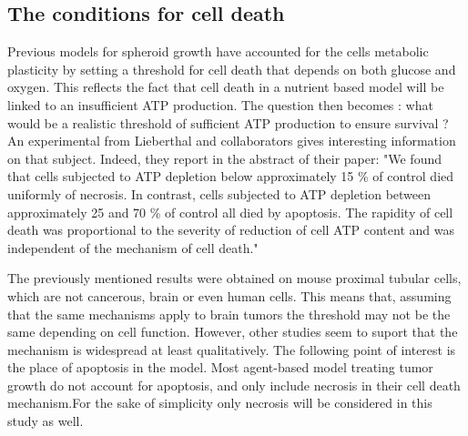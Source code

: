 \documentclass[11pt,a4paper]{article}
\begin{document}
\subsection{The conditions for cell death}
Previous models for spheroid growth have accounted for the cells metabolic plasticity by setting a threshold for cell death that depends on both glucose and oxygen.\cite{Kempf2005}\cite{Jagiella2016} This reflects the fact that cell death in a nutrient based model will be linked to an insufficient ATP production. The question then becomes : what would be a realistic threshold of sufficient ATP production to ensure survival ? An experimental from Lieberthal and collaborators gives interesting information on that subject. Indeed, they report in the abstract of their paper: "We found that cells subjected to ATP depletion below approximately 15 \% of control died uniformly of necrosis. In contrast, cells subjected to ATP depletion between approximately 25 and 70 \% of control all died by apoptosis. The rapidity of cell death was proportional to the severity of reduction of cell ATP content and was independent of the mechanism of cell death."\cite{Lieberthal1998}

The previously mentioned  results were obtained on mouse proximal tubular cells, which are not cancerous, brain or even human cells. This means that, assuming that the same mechanisms apply to brain tumors  the threshold may not be the same depending on cell function. However, other studies seem to suport that the mechanism is widespread at least qualitatively.\cite{Martin2001} The following point of interest is the place of apoptosis in the model. Most agent-based model treating tumor growth do not account for apoptosis, and only include necrosis in their cell death mechanism.\cite{Mao2018}\cite{Kempf2005}\cite{Kempf2015}\cite{Bull2020}\cite{Jagiella2016}\cite{Cleri2019}For the sake of simplicity only necrosis will be considered in this study as well.
\end{document}
